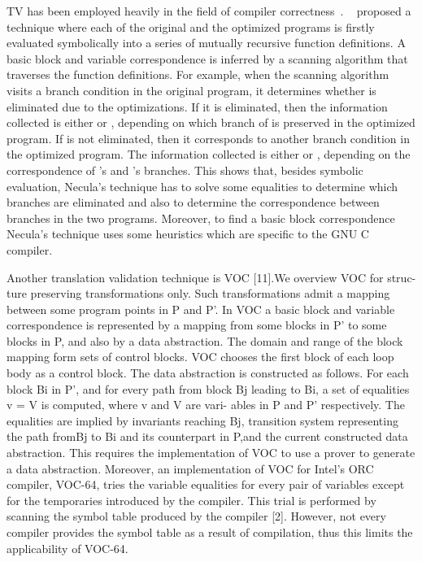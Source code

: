 TV has been employed heavily in the field of compiler
correctness~\cite{VOC2002,TVOC:CAV2005,Necula:2000}.  ~\cite{Necula:2000}
proposed a technique where each of the original and the optimized programs is
firstly evaluated symbolically into a series of mutually recursive function
definitions. A basic block and variable correspondence is inferred by a
scanning algorithm that traverses the function definitions.  For example, when
the scanning algorithm visits a branch condition  in the original program,
    it determines whether  is eliminated due to the optimizations. If it
    is eliminated, then the information collected is either  or , depending on which branch of  is preserved in the optimized
      program. 
%
If  is not eliminated, then it corresponds to another branch condition
 in the optimized program. The information collected is either 
or , depending on the correspondence of ’s and ’s
branches. This shows that, besides symbolic evaluation, Necula’s technique has
to solve some equalities to determine which branches are eliminated and also to
determine the correspondence between branches in the two programs. Moreover, to
find a basic block correspondence Necula’s technique uses some heuristics which
are specific to the GNU C compiler.
  
Another translation validation technique is VOC [11].We overview VOC for struc-
ture preserving transformations only. Such transformations admit a mapping
between some program points in P and P'. In VOC a basic block and variable
correspondence is represented by a mapping from some blocks in P' to some
blocks in P, and also by a data abstraction. The domain and range of the block
mapping form sets of control blocks. VOC chooses the first block of each loop
body as a control block. The data abstraction is constructed as follows. For
each block Bi in P', and for every path from block Bj leading to Bi, a set of
equalities v = V is computed, where v and V are vari- ables in P and P'
respectively. The equalities are implied by invariants reaching Bj, transition
system representing the path fromBj to Bi and its counterpart in P,and the
current constructed data abstraction. This requires the implementation of VOC
to use a prover to generate a data abstraction. Moreover, an implementation of
VOC for Intel’s ORC compiler, VOC-64, tries the variable equalities for every
pair of variables except for the temporaries introduced by the compiler. This
trial is performed by scanning the symbol table produced by the compiler [2].
However, not every compiler provides the symbol table as a result of
compilation, thus this limits the applicability of VOC-64.
  
